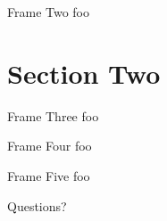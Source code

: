 \documentclass[aspectratio=1610]{beamer}
\begin{document}


\begin{frame}{Frame Two}
	foo
\end{frame}


\section{Section Two}


\begin{frame}{Frame Three}
	foo
\end{frame}


\begin{frame}{Frame Four}
	foo
\end{frame}


\begin{frame}{Frame Five}
	foo
\end{frame}


\begin{frame}[standout]
	Questions?
\end{frame}
\end{document}
